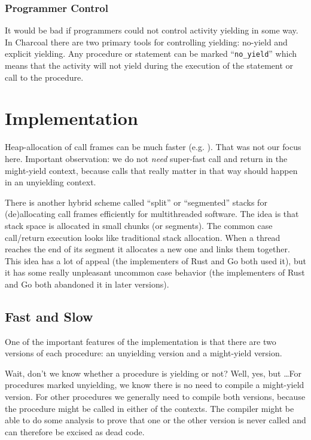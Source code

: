 \documentclass[10pt,preprint]{sigplanconf}
\begin{document}
\subsubsection{Programmer Control}

It would be bad if programmers could not control activity yielding in some way.
In Charcoal there are two primary tools for controlling yielding: no-yield and explicit yielding.
Any procedure or statement can be marked ``\texttt{no\_yield}'' which means that the activity will not yield during the execution of the statement or call to the procedure.

\section{Implementation}

Heap-allocation of call frames can be much faster
(e.g. \cite{Shao2000}).  That was not our focus here.  Important
observation: we do not \emph{need} super-fast call and return in the
might-yield context, because calls that really matter in that way should
happen in an unyielding context.

There is another hybrid scheme called ``split'' or ``segmented'' stacks
for (de)allocating call frames efficiently for multithreaded software.
The idea is that stack space is allocated in small chunks (or segments).
The common case call/return execution looks like traditional stack
allocation.  When a thread reaches the end of its segment it allocates a
new one and links them together.  This idea has a lot of appeal (the
implementers of Rust and Go both used it), but it has some really
unpleasant uncommon case behavior (the implementers of Rust and Go both
abandoned it in later versions).

\subsection{Fast and Slow}

One of the important features of the implementation is that there are
two versions of each procedure: an unyielding version and a might-yield
version.

Wait, don't we know whether a procedure is yielding or not?  Well, yes,
but \ldots For procedures marked unyielding, we know there is no need to
compile a might-yield version.  For other procedures we generally need
to compile both versions, because the procedure might be called in
either of the contexts.  The compiler might be able to do some analysis
to prove that one or the other version is never called and can therefore
be excised as dead code.
\end{document}
